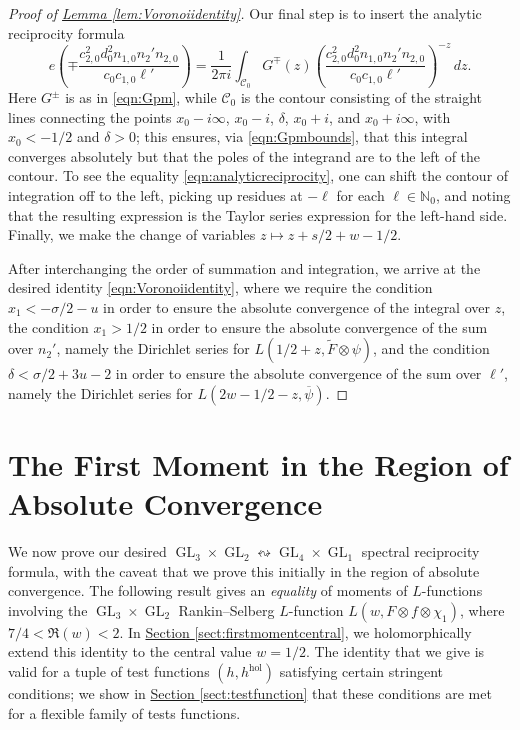 \documentclass[11pt,a4paper]{amsart}
\newcommand{\CC}{\mathcal{C}}
\newcommand{\hol}{\mathrm{hol}}
\newcommand{\N}{\mathbb{N}}
\DeclareMathOperator{\GL}{GL}
\numberwithin{equation}{section}
\theoremstyle{remark}
\theoremstyle{definition}
\begin{document}
\begin{proof}[Proof of {\hyperref[lem:Voronoiidentity]{Lemma \ref*{lem:Voronoiidentity}}}]
Our final step is to insert the analytic reciprocity formula
\begin{equation}
\label{eqn:analyticreciprocity}
e\left(\mp \frac{c_{2,0}^2 d_0^2 n_{1,0} n_2' n_{2,0}}{c_0 c_{1,0} \ell'}\right) = \frac{1}{2\pi i} \int_{\CC_0} G^{\mp}(z) \left(\frac{c_{2,0}^2 d_0^2 n_{1,0} n_2' n_{2,0}}{c_0 c_{1,0} \ell'}\right)^{-z} \, dz.
\end{equation}
Here $G^{\pm}$ is as in \eqref{eqn:Gpm}, while $\CC_0$ is the contour consisting of the straight lines connecting the points $x_0 - i\infty$, $x_0 - i$, $\delta$, $x_0 + i$, and $x_0 + i\infty$, with $x_0 < -1/2$ and $\delta > 0$; this ensures, via \eqref{eqn:Gpmbounds}, that this integral converges absolutely but that the poles of the integrand are to the left of the contour. To see the equality \eqref{eqn:analyticreciprocity}, one can shift the contour of integration off to the left, picking up residues at $-\ell$ for each $\ell \in \N_0$, and noting that the resulting expression is the Taylor series expression for the left-hand side. Finally, we make the change of variables $z \mapsto z + s/2 + w - 1/2$.

After interchanging the order of summation and integration, we arrive at the desired identity \eqref{eqn:Voronoiidentity}, where we require the condition $x_1 < -\sigma/2 - u$ in order to ensure the absolute convergence of the integral over $z$, the condition $x_1 > 1/2$ in order to ensure the absolute convergence of the sum over $n_2'$, namely the Dirichlet series for $L(1/2 + z, \widetilde{F} \otimes \psi)$, and the condition $\delta < \sigma/2 + 3u - 2$ in order to ensure the absolute convergence of the sum over $\ell'$, namely the Dirichlet series for $L(2w - 1/2 - z,\overline{\psi})$.
\end{proof}


\section{The First Moment in the Region of Absolute Convergence}

We now prove our desired $\GL_3 \times \GL_2 \leftrightsquigarrow \GL_4 \times \GL_1$ spectral reciprocity formula, with the caveat that we prove this initially in the region of absolute convergence. The following result gives an \emph{equality} of moments of $L$-functions involving the $\GL_3 \times \GL_2$ Rankin--Selberg $L$-function $L(w,F \otimes f \otimes \chi_1)$, where $7/4 < \Re(w) < 2$. In \hyperref[sect:firstmomentcentral]{Section \ref*{sect:firstmomentcentral}}, we holomorphically extend this identity to the central value $w = 1/2$. The identity that we give is valid for a tuple of test functions $(h,h^{\hol})$ satisfying certain stringent conditions; we show in \hyperref[sect:testfunction]{Section \ref*{sect:testfunction}} that these conditions are met for a flexible family of tests functions.
\end{document}
